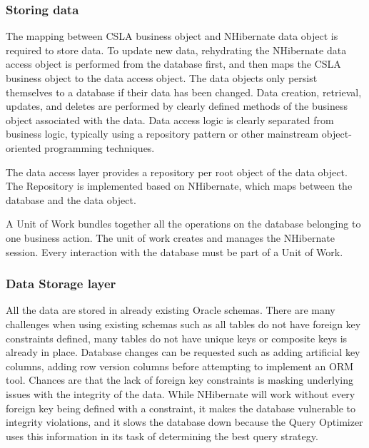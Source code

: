 \subsubsection{Storing data}
The mapping between CSLA business object and NHibernate data object is required to store data. To update new data, rehydrating the NHibernate data access object is performed from the database first, and then maps the CSLA business object to the data access object. The data objects only persist themselves to a database if their data has been changed. Data creation, retrieval, updates, and deletes are performed by clearly defined methods of the business object associated with the data. Data access logic is clearly separated from business logic, typically using a repository pattern or other mainstream object-oriented programming techniques.
\par
The data access layer provides a repository per root object of the data object. The Repository is implemented based on NHibernate, which maps between the database and the data object.
\par
A Unit of Work bundles together all the operations on the database belonging to one business action. The unit of work creates and manages the NHibernate session. Every interaction with the database must be part of a Unit of Work.
%

\subsubsection{Data Storage layer}
All the data are stored in already existing Oracle schemas. There are many challenges when using existing schemas such as all tables do not have foreign key constraints defined, many tables do not have unique keys or composite keys is already in place. Database changes can be requested such as adding artificial key columns, adding row version columns before attempting to implement an ORM tool. 
Chances are that the lack of foreign key constraints is masking underlying issues with the integrity of the data. While NHibernate will work without every foreign key being defined with a constraint, it makes the database vulnerable to integrity violations, and it slows the database down because the Query Optimizer uses this information in its task of determining the best query strategy.
%

